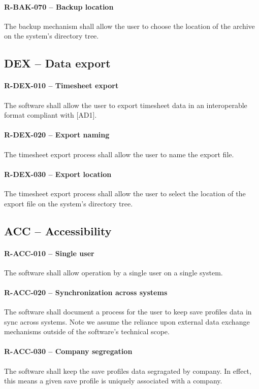 \paragraph{R-BAK-070 -- Backup location}
The backup mechanism shall allow the user to choose the location of the
archive on the system's directory tree.

\subsection{DEX -- Data export}
\paragraph{R-DEX-010 -- Timesheet export}
The software shall allow the user to export timesheet data in an interoperable
format compliant with [AD1].

\paragraph{R-DEX-020 -- Export naming}
The timesheet export process shall allow the user to name the export file.

\paragraph{R-DEX-030 -- Export location}
The timesheet export process shall allow the user to select the location
of the export file on the system's directory tree.

\subsection{ACC -- Accessibility}
\paragraph{R-ACC-010 -- Single user}
The software shall allow operation by a single user on a single system.

\paragraph{R-ACC-020 -- Synchronization across systems}
The software shall document a process for the user to keep save profiles data in
sync across systems. Note we assume the reliance upon external data exchange
mechanisms outside of the software's technical scope.

\paragraph{R-ACC-030 -- Company segregation}
The software shall keep the save profiles data segragated by company.
In effect, this means a given save profile is uniquely associated with a
company.

